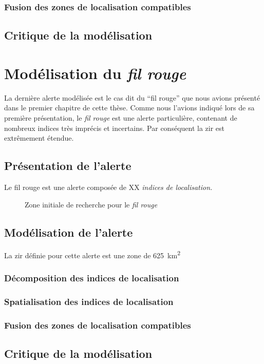 \subsubsection{Fusion des zones de localisation compatibles}
\label{subsec:9-2-2-4}

\subsection{Critique de la modélisation}
\label{subsec:9-2-3}




\section{Modélisation du \emph{fil rouge}}
\label{sec:9-3}

La dernière alerte modélisée est le cas dit du \enquote{fil rouge} que
nous avions présenté dans le premier chapitre de cette thèse. Comme
nous l'avions indiqué lors de sa première présentation, le \emph{fil
  rouge} est une alerte particulière, contenant de nombreux indices
très imprécis et incertains. Par conséquent la \ac{zir} est
extrêmement étendue.


\subsection{Présentation de l'alerte}
\label{subsec:9-3-1}

Le fil rouge est une alerte composée de XX \emph{indices de
  localisation.}

\begin{figure}
  \centering
  
  \caption{Zone initiale de recherche pour le \emph{fil rouge}}
  \label{fig:zir_fil_rouge}
\end{figure}

\subsection{Modélisation de l'alerte}
\label{subsec:9-3-2}

La \ac{zir} définie pour cette alerte est une zone de
\SI{625}{\kilo\meter\squared}

\subsubsection{Décomposition des indices de localisation}
\label{subsec:9-3-2-1}

\subsubsection{Spatialisation des indices de localisation}
\label{subsec:9-3-2-2}

\subsubsection{Fusion des zones de localisation compatibles}
\label{subsec:9-3-2-3}

\subsection{Critique de la modélisation}
\label{subsec:9-3-3}


